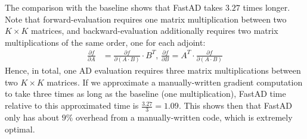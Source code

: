 The comparison with the baseline shows that FastAD takes $ 3.27$ times longer.
Note that forward-evaluation requires one matrix multiplication between two $K\times K$ matrices,
and backward-evaluation additionally requires two matrix multiplications of the same order,
one for each adjoint:
\begin{align*}
    \frac{\partial f}{\partial A} 
    &= \frac{\partial f}{\partial (A\cdot B)} \cdot B^T, \,
    \frac{\partial f}{\partial B} 
    = A^T \cdot \frac{\partial f}{\partial (A\cdot B)}
\end{align*}
Hence, in total, one AD evaluation requires three matrix multiplications between two $K\times K$ matrices.
If we approximate a manually-written gradient computation to take 
three times as long as the baseline (one multiplication), 
FastAD time relative to this approximated time
is $\frac{3.27}{3} = 1.09$.
This shows then that FastAD only has about $ 9\%$ overhead 
from a manually-written code, which is extremely optimal.
